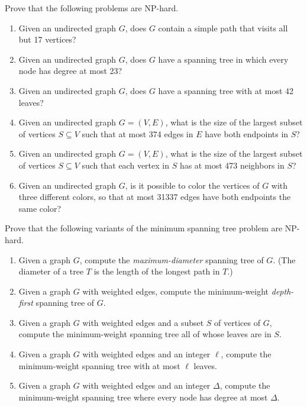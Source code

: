 \begin{exercises}
\item Prove that the following problems are NP-hard.
\begin{enumerate}
\item Given an undirected graph $G$, does $G$ contain a simple path that visits all but 17 vertices?
\item Given an undirected graph $G$, does $G$ have a spanning tree in which every node has degree at most 23?
\item Given an undirected graph $G$, does $G$ have a spanning tree with at most 42 leaves?
\item Given an undirected graph $G = (V, E)$, what is the size of the largest subset of vertices $S \subseteq V$ such that at most 374 edges in $E$ have both endpoints in $S$?
\item Given an undirected graph $G = (V, E)$, what is the size of the largest subset of vertices $S \subseteq V$ such that each vertex in $S$ has at most 473 neighbors in $S$?
\item Given an undirected graph $G$, is it possible to color the vertices of $G$ with three different colors, so that at most 31337 edges have both endpoints the same color?
\end{enumerate}

\item Prove that the following variants of the minimum spanning tree problem are NP-hard.
\begin{enumerate}
\item Given a graph $G$, compute the \textit{maximum-diameter} spanning tree of $G$.
(The diameter of a tree $T$ is the length of the longest path in $T$.)
\item Given a graph $G$ with weighted edges, compute the minimum-weight \textit{depth-first} spanning tree of $G$.
\item Given a graph $G$ with weighted edges and a subset $S$ of vertices of $G$, compute the minimum-weight spanning tree all of whose leaves are in $S$.
\item Given a graph $G$ with weighted edges and an integer $\ell$, compute the minimum-weight spanning tree with at most $\ell$ leaves.
\item Given a graph $G$ with weighted edges and an integer $\Delta$, compute the minimum-weight spanning tree where every node has degree at most $\Delta$.
\end{enumerate}


\end{exercises}
